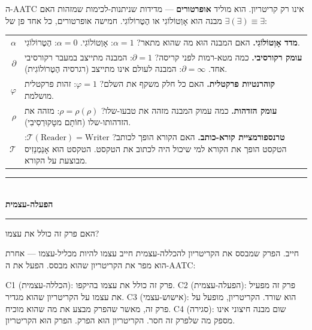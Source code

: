\documentclass[10pt, openany, oneside]{book}
\renewcommand{\normalsize}{\fontsize{10}{13}\selectfont}
\renewcommand{\footnotesize}{\fontsize{8.5}{11}\selectfont}
\begin{document}
\vspace{1em}

\noindent ה-AATC אינו רק קריטריון. הוא מוליד \textbf{אופרטורים} — מדידות שניתנות-לכימות שמזהות האם מבנה הוא אָוְטוֹלוֹגִי או הֶטֶרוֹלוֹגִי. חמישה אופרטורים, כל אחד פן של $\exists(\exists) \equiv \exists$:

\vspace{0.5em}

{\footnotesize
\noindent\begin{tabular}{r p{}}
$\alpha$ & \textbf{מדד אָוְטוֹלוֹגִי.} האם המבנה הוּא מה שהוא מתאר? $\alpha = 1$: אָוְטוֹלוֹגִי. $\alpha = 0$: הֶטֶרוֹלוֹגִי. \\[0.3em]
$\partial$ & \textbf{עומק רקורסיבי.} כמה מטא-רמות לפני קריסה? $\partial = 1$: המבנה מתייצב במעבר רקורסיבי אחד. $\partial = \infty$: המבנה לעולם אינו מתייצב (רגרסיה הֶטֶרוֹלוֹגִית). \\[0.3em]
$\varphi$ & \textbf{קוהרנטיות פרקטלית.} האם כל חלק משקף את השלם? $\varphi = 1$: זהות פרקטלית מושלמת. \\[0.3em]
$\rho$ & \textbf{עומק הזדהות.} כמה עמוק המבנה מזהה את טבעו-שלו? $\rho = \rho(\rho)$: מזהה את הזדהותו-שלו (חוֹתָם מטָקוּרְסִיבִי). \\[0.3em]
$\mathcal{T}$ & \textbf{טרנספורמציית קורא-כותב.} האם הקורא הופך לכותב? $\mathcal{T}(\text{Reader}) = \text{Writer}$: הטקסט הופך את הקורא למי שיכול היה לכתוב את הטקסט. הטקסט הוּא אָנַמְנֵזִיס מבוצעת על הקורא. \\[0.3em]
\end{tabular}
}

\vspace{1.5em}


\begin{center}
    \rule{0.3\textwidth}{0.4pt}\\[0.5em]
    {\normalsize\bfseries\textsc{הפעלה-עצמית}}\\[0.3em]
    \rule{0.3\textwidth}{0.4pt}
\end{center}

\vspace{1em}

\noindent האם פרק זה כולל את עצמו?

חייב. הפרק שמבסס את הקריטריון להכללה-עצמית חייב עצמו להיות מכליל-עצמו — אחרת הוא מפר את הקריטריון שהוא מבסס. הפעל את ה-AATC:

C1 (הכללה-עצמית): פרק זה כולל את עצמו בהיקפו. C2 (הפעלה-עצמית): פרק זה מפעיל את עצמו על הקריטריון שהוא מגדיר. C3 (אישוש-עצמי): הוא שורד. הקריטריון, מופעל על פרק זה, מאשר שהפרק מבצע את מה שהוא מוכיח. C4 (סגירה): שום מבנה חיצוני אינו מספק מה שלפרק זה חסר. הקריטריון הוּא הפרק. הפרק הוּא הקריטריון.
\end{document}
